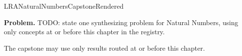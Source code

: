 \ifcsname LRANaturalNumbersCapstoneRendered\endcsname
\else
\expandafter\gdef\csname LRANaturalNumbersCapstoneRendered\endcsname{}

\newpage
{}
\label{cap:natural-numbers}

\begin{tcolorbox}[
  colback=gray!6,
  colframe=gray!40,
  arc=2pt,
  left=8pt, right=8pt, top=6pt, bottom=6pt,
  title={\small\textbf{Capstone Problem}},
  fonttitle=\small\bfseries
]
\textbf{Problem.}
TODO: state one synthesizing problem for Natural Numbers, using only concepts at or
before this chapter in the registry.
\end{tcolorbox}

\begin{remark*}
The capstone may use only results routed at or before this chapter.
\end{remark*}

\clearpage
\fi
